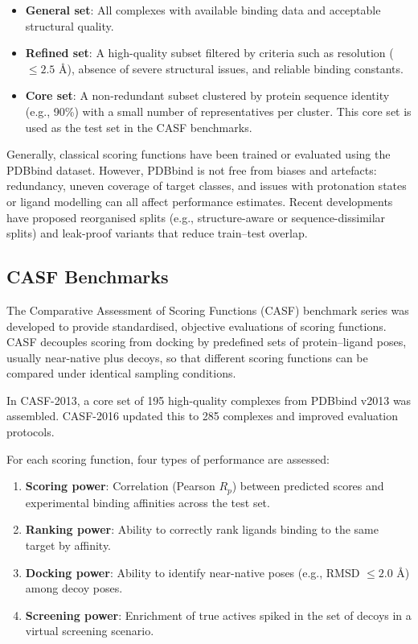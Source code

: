 \documentclass[12pt]{article}
\begin{document}
\begin{itemize}
    \item \textbf{General set}: All complexes with available binding data and acceptable structural quality.
    \item \textbf{Refined set}: A high-quality subset filtered by criteria such as resolution ($\leq 2.5$ \r{A}), absence of severe structural issues, and reliable binding constants.
    \item \textbf{Core set}: A non-redundant subset clustered by protein sequence identity (e.g., 90\%) with a small number of representatives per cluster. This core set is used as the test set in the CASF benchmarks.
\end{itemize}

Generally, classical scoring functions have been trained or evaluated using the PDBbind dataset\cite{CH3_Trott2010_Vina,CH3_Wang2017}. However, PDBbind is not free from biases and artefacts: redundancy, uneven coverage of target classes, and issues with protonation states or ligand modelling can all affect performance estimates. Recent developments have proposed reorganised splits (e.g., structure-aware or sequence-dissimilar splits) and leak-proof variants that reduce train--test overlap\cite{CH3_li2017structural,CH3_li2021machine}.

\subsection{CASF Benchmarks} \label{sec:CASF}
The Comparative Assessment of Scoring Functions (CASF) benchmark series was developed to provide standardised, objective evaluations of scoring functions\cite{CH3_Wang2014_CASF2013_Set,CH3_Wang2014_CASF2013_Results,CH3_Su2019_CASF2016}. CASF decouples scoring from docking by predefined sets of protein--ligand poses, usually near-native plus decoys, so that different scoring functions can be compared under identical sampling conditions.

In CASF-2013, a core set of 195 high-quality complexes from PDBbind v2013 was assembled\cite{CH3_Wang2014_CASF2013_Set}. CASF-2016 updated this to 285 complexes and improved evaluation protocols\cite{CH3_Su2019_CASF2016}.

For each scoring function, four types of performance are assessed:

\begin{enumerate}
    \item \textbf{Scoring power}: Correlation (Pearson $R_p$) between predicted scores and experimental binding affinities across the test set.
    \item \textbf{Ranking power}: Ability to correctly rank ligands binding to the same target by affinity.
    \item \textbf{Docking power}: Ability to identify near-native poses (e.g., RMSD $\leq 2.0$ \r{A}) among decoy poses.
    \item \textbf{Screening power}: Enrichment of true actives spiked in the set of decoys in a virtual screening scenario.
\end{enumerate}
\end{document}
